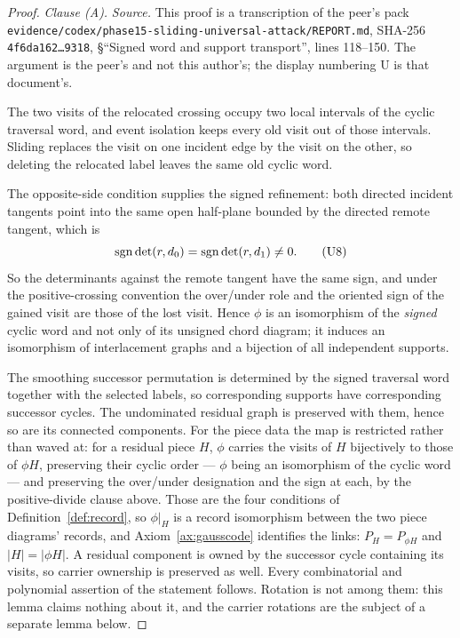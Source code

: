 \begin{proof}
\emph{Clause (A).}
\emph{Source.} This proof is a transcription of the peer's pack \texttt{evidence/codex/phase15-sliding-universal-attack/REPORT.md}, SHA-256 \texttt{4f6da162\dots9318}, §``Signed word and support transport'',
lines 118--150. The argument is the peer's and not this author's; the display
numbering $\mathrm{U}$ is that document's.

The two visits of the relocated crossing occupy two local intervals of the
cyclic traversal word, and event isolation keeps every old visit out of those
intervals. Sliding replaces the visit on one incident edge by the visit on the
other, so deleting the relocated label leaves the same old cyclic word.

The opposite-side condition supplies the signed refinement: both directed
incident tangents point into the same open half-plane bounded by the directed
remote tangent, which is
\begin{equation}
   \operatorname{sgn}\det(r,d_0)=\operatorname{sgn}\det(r,d_1)\neq0 .
   \tag{U8}
\end{equation}
So the determinants against the remote tangent have the same sign, and under
the positive-crossing convention the over/under role and the oriented sign of
the gained visit are those of the lost visit. Hence $\phi$ is an isomorphism of
the \emph{signed} cyclic word and not only of its unsigned chord diagram; it
induces an isomorphism of interlacement graphs and a bijection of all
independent supports.

The smoothing successor permutation is determined by the signed traversal word
together with the selected labels, so corresponding supports have corresponding
successor cycles. The undominated residual graph is preserved with them, hence
so are its connected components. For the piece data the map is restricted
rather than waved at: for a residual piece $H$, $\phi$ carries the visits of $H$
bijectively to those of $\phi H$, preserving their cyclic order --- $\phi$ being
an isomorphism of the cyclic word --- and preserving the over/under designation
and the sign at each, by the positive-divide clause above. Those are the four
conditions of Definition~\ref{def:record}, so $\phi|_H$ is a record isomorphism
between the two piece diagrams' records, and Axiom~\ref{ax:gausscode}
identifies the links: $P_H=P_{\phi H}$ and $|H|=|\phi H|$. A residual component
is owned by the successor cycle containing its visits, so carrier ownership is
preserved as well. Every combinatorial and polynomial assertion of the statement follows. Rotation
is not among them: this lemma claims nothing about it, and the carrier rotations
are the subject of a separate lemma below.


\end{proof}
